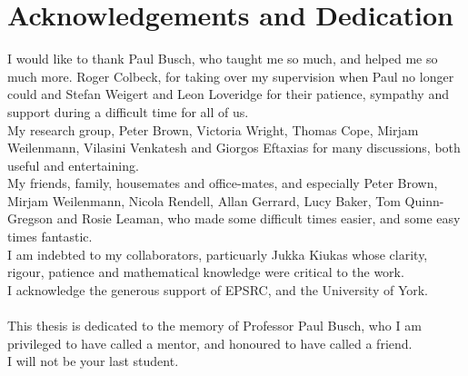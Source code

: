
\chapter*{Acknowledgements and Dedication}
\setcounter{page}{11}

I would like to thank Paul Busch, who taught me so much, and helped me so much more. Roger Colbeck, for taking over my supervision when Paul no longer could and Stefan Weigert and Leon Loveridge for their patience, sympathy and support during a difficult time for all of us.\\
My research group, Peter Brown, Victoria Wright, Thomas Cope, Mirjam Weilenmann, Vilasini Venkatesh and Giorgos Eftaxias for many discussions, both useful and entertaining.\\
My friends, family, housemates and office-mates, and especially Peter Brown, Mirjam Weilenmann, Nicola Rendell, Allan Gerrard, Lucy Baker, Tom Quinn-Gregson and Rosie Leaman, who made some difficult times easier, and some easy times fantastic.\\
I am indebted to my collaborators, particuarly Jukka Kiukas whose clarity, rigour, patience and mathematical knowledge were critical to the work.\\
I acknowledge the generous support of EPSRC, and the University of York.\\ \\
This thesis is dedicated to the memory of Professor Paul Busch, who I am privileged to have called a mentor, and honoured to have called a friend. \\I will not be your last student.



\clearpage
